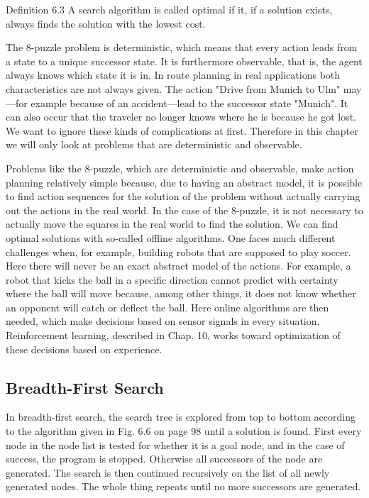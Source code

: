 \documentclass[10pt]{book}
\begin{document}
Definition 6.3 A search algorithm is called optimal if it, if a solution exists, always finds the solution with the lowest cost.

The 8-puzzle problem is deterministic, which means that every action leads from a state to a unique successor state. It is furthermore observable, that is, the agent always knows which state it is in. In route planning in real applications both characteristics are not always given. The action "Drive from Munich to Ulm" may—for example because of an accident—lead to the successor state "Munich". It can also occur that the traveler no longer knows where he is because he got lost. We want to ignore these kinds of complications at first. Therefore in this chapter we will only look at problems that are deterministic and observable.

Problems like the 8-puzzle, which are deterministic and observable, make action planning relatively simple because, due to having an abstract model, it is possible to find action sequences for the solution of the problem without actually carrying out the actions in the real world. In the case of the 8-puzzle, it is not necessary to actually move the squares in the real world to find the solution. We can find optimal solutions with so-called offline algorithms. One faces much different challenges when, for example, building robots that are supposed to play soccer. Here there will never be an exact abstract model of the actions. For example, a robot that kicks the ball in a specific direction cannot predict with certainty where the ball will move because, among other things, it does not know whether an opponent will catch or deflect the ball. Here online algorithms are then needed, which make decisions based on sensor signals in every situation. Reinforcement learning, described in Chap. 10, works toward optimization of these decisions based on experience.

\subsection{Breadth-First Search}
In breadth-first search, the search tree is explored from top to bottom according to the algorithm given in Fig. 6.6 on page 98 until a solution is found. First every node in the node list is tested for whether it is a goal node, and in the case of success, the program is stopped. Otherwise all successors of the node are generated. The search is then continued recursively on the list of all newly generated nodes. The whole thing repeats until no more successors are generated.
\end{document}
